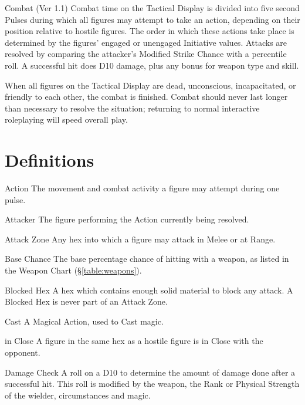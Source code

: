 \begin{Chapter}{Combat (Ver 1.1)}
Combat time on the Tactical Display is divided into five second Pulses
during which all figures may attempt to take an action, depending on
their position relative to hostile figures.  The order in which these
actions take place is determined by the figures’ engaged or unengaged
Initiative values.  Attacks are resolved by comparing the attacker’s
Modified Strike Chance with a percentile roll.  A successful hit does
D10 damage, plus any bonus for weapon type and skill.

When all figures on the Tactical Display are dead, unconscious,
incapacitated, or friendly to each other, the combat is finished.
Combat should never last longer than necessary to resolve the
situation; returning to normal interactive roleplaying will speed
overall play.

\section{Definitions}
\label{combat:definitions}

\begin{Description}
\item[Action] The movement and combat activity a figure may attempt
  during one pulse.

\item[Attacker] The figure performing the Action currently being
  resolved.

\item[Attack] Zone Any hex into which a figure may attack in Melee or
  at Range.

\item[Base Chance] The base percentage chance of hitting with a
  weapon, as listed in the Weapon Chart (\S\ref{table:weapons}).

\item[Blocked Hex] A hex which contains enough solid material to block
  any attack.  A Blocked Hex is never part of an Attack Zone.

\item[Cast] A Magical Action, used to Cast magic.

\item[in Close] A figure in the same hex as a hostile figure is in
  Close with the opponent.

\item[Damage Check] A roll on a D10 to determine the amount of damage
  done after a successful hit. This roll is modified by the weapon,
  the Rank or Physical Strength of the wielder, circumstances and
  magic.


\end{Description}
\end{Chapter}
